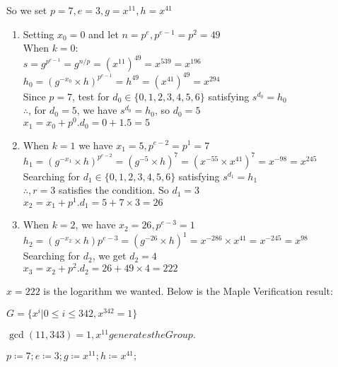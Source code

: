 \documentclass[11pt,a4paper,fleqn]{article}
\begin{document}
\begin{enumerate}[1.]
\begin{flushleft}
\begin{enumerate}
				So we set $p = 7, e = 3, g = x^{11}, h = x^{41}$
				\begin{enumerate}[Step 1.]
					\item Setting $x_0 = 0$ and let $n = p^e, p^{e-1} = p^2 = 49 $\\
					When $k = 0$:\\
					$s = g^{p^{e-1}} = g^{n/p} = (x^{11})^{49} = x^{539} = x^{196}$\\
					$h_0 = (g^{-x_0} \times h)^{p^{e-1}} = h^{49} = (x^{41})^{49} = x^{294}$ \\
					Since $p = 7$, test for $d_0 \in \{0, 1, 2, 3, 4, 5, 6\}$ satisfying $s^{d_0} = h_0$\\
					$\therefore$, for $d_0 = 5$, we have $s^{d_0} = h_0$, so $d_0 = 5$\\
					$x_1 = x_0 + p^0.d_0 = 0 + 1.5 = 5$
					\item When $k = 1$ we have $x_1 = 5, p^{e-2} = p^1 = 7$\\
					$h_1 = (g^{-x_1}\times h)^{p^{e-2}} = (g^{-5}\times h)^7 = (x^{-55} \times x^{41})^7 = x^{-98} = x^{245}$\\
					Searching for $d_1 \in \{0, 1, 2, 3, 4, 5, 6\}$ satisfying $s^{d_1} = h_1$\\
					$\therefore, r = 3$ satisfies the condition. So $d_1 = 3$\\
					$x_2 = x_1 + p^1.d_1 = 5 + 7 \times 3 = 26$\\
					\item When $k = 2$, we have $x_2 = 26, p^{e-3} = 1$\\
					$h_2 = (g^{-x_2} \times h)p^{e-3} = (g^{-26} \times h)^1 = x^{-286} \times x^{41} = x^{-245} = x^{98}$\\
					Searching for $d_2$, we get $d_2 = 4$\\
					$x_3 = x_2 + p^2.d_2 = 26 + 49 \times 4 = 222$
				\end{enumerate}
				$x = 222$ is the logarithm we wanted.
				\bigbreak
				Below is the Maple Verification result:
				\begin{mdframed}

					\begin{Maple Normal}
						{$ \displaystyle G ={\{x^{i}| 0\le i \le 342,x^{342}=1\}} $}
					\end{Maple Normal}
					\begin{Maple Normal}
						{$ \displaystyle \gcd (11,343)=1,x^{11}\mathit{generates} \mathit{the} \mathit{Group} . $}
					\end{Maple Normal}
					\mapleinput
					{$ \displaystyle p \coloneqq 7;e \coloneqq 3;g \coloneqq x^{11};h \coloneqq x^{41}; $}


\end{mdframed}
\end{enumerate}
\end{flushleft}
\end{enumerate}
\end{document}
